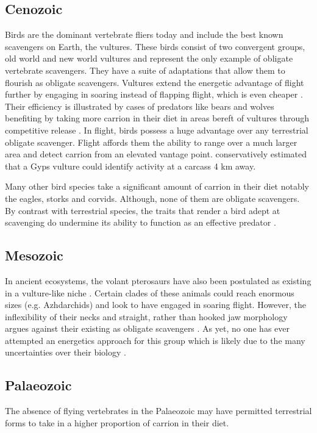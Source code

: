 \documentclass[a4paper,12pt]{article}
\begin{document}
\subsection*{Cenozoic}
Birds are the dominant vertebrate fliers today and include the best known scavengers on Earth, the vultures. 
These birds consist of two convergent groups, old world and new world vultures and represent the only example of obligate vertebrate scavengers. 
They have a suite of adaptations that allow them to flourish as obligate scavengers.
Vultures extend the energetic advantage of flight further by engaging in soaring instead of flapping flight, which is even cheaper \citep{hedenstrom1993migration}.
Their efficiency is illustrated by cases of predators like bears and wolves benefiting by taking more carrion in their diet in areas bereft of vultures through competitive release \citep{devault2003scavenging}. 
In flight, birds possess a huge advantage over any terrestrial obligate scavenger. 
Flight affords them the ability to range over a much larger area and detect carrion from an elevated vantage point.
\cite{pennycuick1972soaring} conservatively estimated that a Gyps vulture could identify activity at a carcass 4 km away. 

Many other bird species take a significant amount of carrion in their diet notably the eagles, storks and corvids. 
Although, none of them are obligate scavengers. 
By contrast with terrestrial species, the traits that render a bird adept at scavenging do undermine its ability to function as an effective predator \citep{devault2003scavenging}. 

\subsection*{Mesozoic}
In ancient ecosystems, the volant pterosaurs have also been postulated as existing in a vulture-like niche \citep{witton2008reappraisal}. 
Certain clades of these animals could reach enormous sizes (e.g. Azhdarchids) and look to have engaged in soaring flight. 
However, the inflexibility of their necks and straight, rather than hooked jaw morphology argues against their existing as obligate scavengers \citep{witton2008reappraisal}. 
As yet, no one has ever attempted an energetics approach for this group which is likely due to the many uncertainties over their biology \citep{witton2010size}. 

\subsection*{Palaeozoic}
The absence of flying vertebrates in the Palaeozoic may have permitted terrestrial forms to take in a higher proportion of carrion in their diet. 
\end{document}
